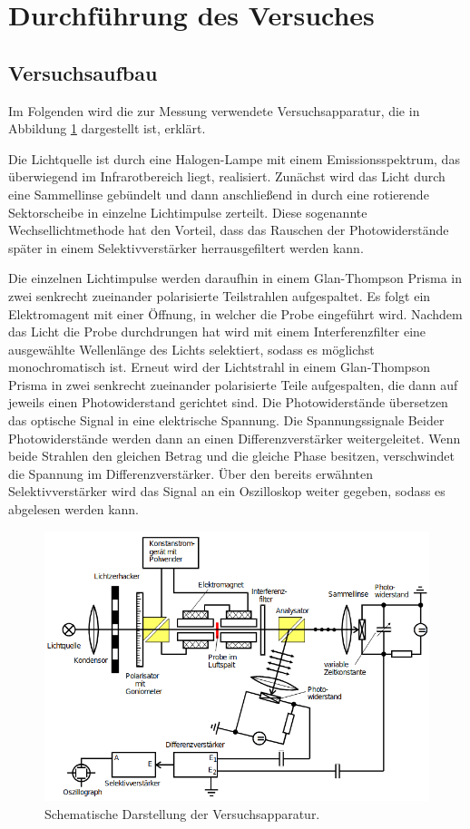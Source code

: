\section{Durchführung des Versuches}
\label{sec:Durchführung}
\subsection{Versuchsaufbau}
Im Folgenden wird die zur Messung verwendete Versuchsapparatur, die in Abbildung \ref{fig:apparatur} dargestellt ist, erklärt.

\noindent
Die Lichtquelle ist durch eine Halogen-Lampe mit einem Emissionsspektrum, das überwiegend im Infrarotbereich liegt, realisiert. 
Zunächst wird das Licht durch eine Sammellinse gebündelt und dann anschließend in durch eine rotierende Sektorscheibe in 
einzelne Lichtimpulse zerteilt. 
Diese sogenannte Wechsellichtmethode hat den Vorteil, dass das Rauschen der Photowiderstände später in einem Selektivverstärker
herrausgefiltert werden kann.

\noindent
Die einzelnen Lichtimpulse werden daraufhin in einem Glan-Thompson Prisma in zwei senkrecht 
zueinander polarisierte Teilstrahlen aufgespaltet. Es folgt ein Elektromagent mit einer Öffnung, in welcher die Probe eingeführt
wird. Nachdem das Licht die Probe durchdrungen hat wird mit einem Interferenzfilter eine ausgewählte Wellenlänge des Lichts 
selektiert, sodass es möglichst monochromatisch ist. Erneut wird der Lichtstrahl in einem Glan-Thompson Prisma in zwei 
senkrecht zueinander polarisierte Teile aufgespalten, die dann auf jeweils einen Photowiderstand gerichtet sind. Die Photowiderstände
übersetzen das optische Signal in eine elektrische Spannung. Die Spannungssignale Beider Photowiderstände werden dann an einen
Differenzverstärker weitergeleitet. Wenn beide Strahlen den gleichen Betrag und die gleiche Phase besitzen, verschwindet die Spannung
im Differenzverstärker. Über den bereits erwähnten Selektivverstärker wird das Signal an ein Oszilloskop weiter gegeben, sodass
es abgelesen werden kann.   

\begin{figure}[H]
    \centering
    \includegraphics[scale=0.7]{pictures/Versuchsaufbau.png}
    \caption{Schematische Darstellung der Versuchsapparatur. \cite{Versuchsbeschreibung}}
    \label{fig:apparatur}
\end{figure}

